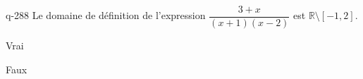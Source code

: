 \begin{truefalse}{q-288}
Le domaine de définition de l'expression $\dfrac{3+x}{(x+1)(x-2)}$ est $\mathbb R \setminus [-1,2]$.
\item Vrai
\item* Faux
\end{truefalse}

